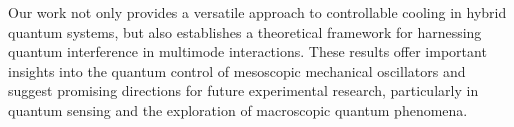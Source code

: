 \documentclass[aps, prresearch, reprint, nofootinbib, longbibliography]{revtex4-2}
\begin{document}
Our work not only provides a versatile approach to controllable cooling in hybrid quantum systems, but also establishes a theoretical framework for harnessing quantum interference in multimode interactions. These results offer important insights into the quantum control of mesoscopic mechanical oscillators and suggest promising directions for future experimental research, particularly in quantum sensing and the exploration of macroscopic quantum phenomena.\\\\

\end{document}
